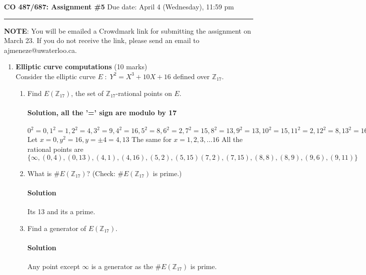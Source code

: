 \documentclass[11pt]{article}
\newcommand{\ZZ}{{\mathbb Z}}
\begin{document}
\noindent
{\large\bf CO 487/687: Assignment \#5} \hfill Due date: April 4 (Wednesday),
11:59 pm

\hfill\hrule

\vspace*{2mm}
\noindent
{\bf NOTE}: You will be emailed a Crowdmark link for submitting the
assignment on March 23. If you do not receive the link, please
send an email to ajmeneze@uwaterloo.ca.

\begin{enumerate}

\item {\bf Elliptic curve computations} (10 marks)\\
Consider the elliptic curve $E \; : \; Y^2 = X^3 + 10X + 16$ defined over
$\ZZ_{17}$.
\begin{enumerate}
\item Find $E(\ZZ_{17})$, the set of $\ZZ_{17}$-rational points on $E$.
\paragraph{Solution, all the '=' sign are modulo by 17}
$0^2=0, 1^2=1, 2^2=4, 3^2=9,4^2=16,5^2=8, 6^2=2, 7^2=15,8^2=13,9^2=13,10^2=15,11^2=2, 12^2=8, 13^2=16, 14^2=9, 15^2=4, 16^2=1$\\
Let $x=0, y^2= 16, y=\pm 4=4, 13$ The same for $x=1,2,3,\dots 16$
All the rational points are $\{ \infty, (0,4),(0,13),(4,1),(4,16),(5,2),(5,15) (7,2),(7,15),(8,8),(8,9),(9,6),(9,11) \}$
\item What is $\# E(\ZZ_{17})$? (Check: $\# E(\ZZ_{17})$ is prime.)
\paragraph{Solution} Its 13 and its a prime.
\item Find a generator of $E(\ZZ_{17})$.
\paragraph{Solution}
Any point except $\infty$ is a generator as the $\# E(\ZZ_{17})$ is prime.




\end{enumerate}
\end{enumerate}
\end{document}
